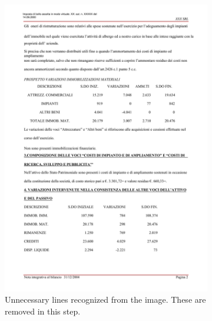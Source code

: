 \begin{figure}[p]
\begin{subfigure}{0.45\textwidth}
\includegraphics[width=\linewidth]{img/implementation/implem2.png}
\caption{Unnecessary lines recognized from the image. These are removed in this step.}
\label{fig:implem2}
\end{subfigure}
\begin{subfigure}{0.45\textwidth}

\end{subfigure}
\end{figure}
